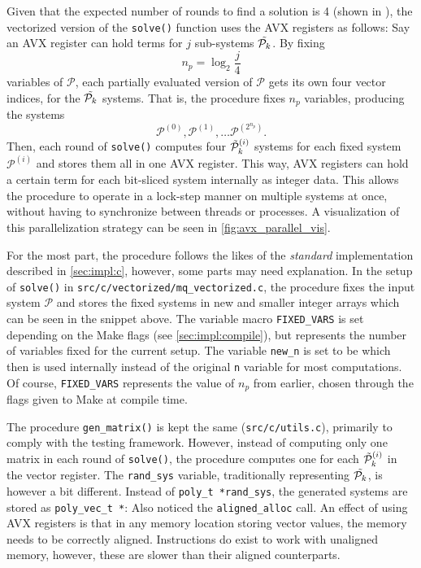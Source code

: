 Given that the expected number of rounds to find a solution is 4 (shown in \cite{eurocrypt-2021-30841}), the vectorized version of the \texttt{solve()} function uses the AVX registers as follows: Say an AVX register can hold terms for $j$ sub-systems $\Tilde{\mathcal{P}_k}$. By fixing 
$$
    n_p = \log_2 \frac{j}{4}
$$ 
variables of $\mathcal{P}$, each partially evaluated version of $\mathcal{P}$ gets its own four vector indices, for the $\Tilde{\mathcal{P}_k}$ systems. That is, the procedure fixes $n_p$ variables, producing the systems
$$
    \mathcal{P}^{(0)}, \mathcal{P}^{(1)}, \dots \mathcal{P}^{(2^{n_{p}})}.
$$
Then, each round of \texttt{solve()} computes four $\Tilde{\mathcal{P}}^{(i)}_k$ systems for each fixed system $\mathcal{P}^{(i)}$ and stores them all in one AVX register. This way, AVX registers can hold a certain term for each bit-sliced system internally as integer data. This allows the procedure to operate in a lock-step manner on multiple systems at once, without having to synchronize between threads or processes. A visualization of this parallelization strategy can be seen in \cref{fig:avx_parallel_vis}.

For the most part, the procedure follows the likes of the \textit{standard} implementation described in \cref{sec:impl:c}, however, some parts may need explanation. In the setup of \texttt{solve()} in \texttt{src/c/vectorized/mq\_vectorized.c}, the procedure fixes the input system $\mathcal{P}$ and stores the fixed systems in new and smaller integer arrays
which can be seen in the snippet above. The variable macro \texttt{FIXED\_VARS} is set depending on the Make flags (see \cref{sec:impl:compile}), but represents the number of variables fixed for the current setup. The variable \texttt{new\_n} is set to be 
which then is used internally instead of the original \texttt{n} variable for most computations. Of course, \texttt{FIXED\_VARS} represents the value of $n_p$ from earlier, chosen through the flags given to Make at compile time.

The procedure \texttt{gen\_matrix()} is kept the same (\texttt{src/c/utils.c}), primarily to comply with the testing framework. However, instead of computing only one matrix in each round of \texttt{solve()}, the procedure computes one for each $\Tilde{\mathcal{P}}^{(i)}_k$ in the vector register. The \texttt{rand\_sys} variable, traditionally representing $\Tilde{\mathcal{P}_k}$, is however a bit different. Instead of \texttt{poly\_t *rand\_sys}, the generated systems are stored as \texttt{poly\_vec\_t *}:
Also noticed the \texttt{aligned\_alloc} call. An effect of using AVX registers is that in any memory location storing vector values, the memory needs to be correctly aligned. Instructions do exist to work with unaligned memory, however, these are slower than their aligned counterparts.

